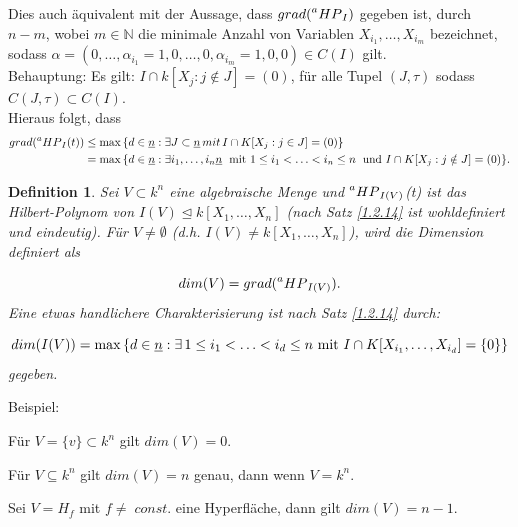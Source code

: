 \documentclass{article}
\newtheorem{definition}[satz]{Definition}
\newcommand*{\R}{k[X_{1},\ldots,X_{n}]}
\newcommand*{\indx}[2]{{#1}_{#2}}
\newcommand*{\hp}[1]{$\prescript{a}{}{HP}_{#1}$}
\begin{document}
\begin{compactenum}
	Dies auch äquivalent mit der Aussage, dass $grad(\textnormal{\hp{I}})$ gegeben ist, durch $n-m$, wobei $m\in\mathbb{N}$ die minimale Anzahl von Variablen $\indx{X}{\indx{i}{1}},\ldots,\indx{X}{\indx{i}{m}}$ bezeichnet, sodass $\alpha=(0,\ldots,\indx{\alpha}{\indx{i}{1}}=1,0,\ldots,0,\indx{\alpha}{\indx{i}{m}}=1,0,0)\in C(I)$ gilt.\\
	
	Behauptung: Es gilt: $I\cap k\left[\indx{X}{j}:j\notin J\right]={(0)}$, für alle Tupel $(J,\tau)$ sodass $C(J,\tau)\subset C(I)$.\\
	
	Hieraus folgt, dass
	\begin{align*}
	grad(\textnormal{\hp{I}}(t))&\leq \max{\{d\in\underline{n}:\exists J\subset\underline{n}\, mit\,I\cap K[\indx{X}{j}:j\in J]=(0)\}}\\&
	= \max{\{d\in\underline{n}:\exists \indx{i}{1},\ldots,\indx{i}{n}\underline{n}\; \textnormal{ mit }  1\leq\indx{i}{1}<\ldots<\indx{i}{n}\leq n\;\textnormal{ und }I\cap K[\indx{X}{j}:j\notin J]=(0)\}}.
	\end{align*}
\end{compactenum}

\begin{definition}
	Sei $V\subset k^n$ eine algebraische Menge und \hp{I(V)}(t) ist das Hilbert-Polynom von $I(V)\unlhd\R$ (nach Satz \ref{1.2.14} ist wohldefiniert und eindeutig). Für $V\neq\emptyset$ (d.h. $I(V)\neq\R$), wird die Dimension definiert als 
	
	\begin{displaymath}
	dim(V)=grad(\textnormal{\hp{I(V)}}).
	\end{displaymath}
	Eine etwas handlichere Charakterisierung ist nach Satz \ref{1.2.14} durch:
	
	\begin{displaymath}
	dim(I(V))=\max{\{d\in\underline{n}:\exists{\,} 1\leq\indx{i}{1}<\ldots<\indx{i}{d}\leq n \textnormal{ mit } I\cap K[\indx{X}{\indx{i}{1}},\ldots,\indx{X}{\indx{i}{d}}]=\{0\} \}}
	\end{displaymath}
	gegeben.\\
\end{definition}
Beispiel: 
\begin{compactenum}
	\item Für $V=\{v\}\subset k^n$ gilt $dim(V)=0$.
	\item Für $V\subseteq k^n$ gilt $dim(V)=n$ genau, dann wenn $V=k^n$.
	\item Sei $V=\indx{H}{f}$ mit $f\neq\; const.$ eine Hyperfläche, dann gilt $dim(V)=n-1$.\\
\end{compactenum}
\end{document}
